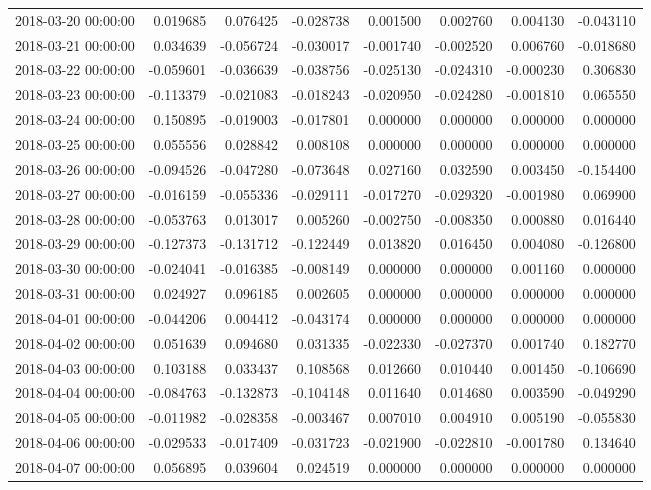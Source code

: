 \begin{tabular}{lrrrrrrr}
2018-03-20 00:00:00 & 0.019685 & 0.076425 & -0.028738 & 0.001500 & 0.002760 & 0.004130 & -0.043110 \\
2018-03-21 00:00:00 & 0.034639 & -0.056724 & -0.030017 & -0.001740 & -0.002520 & 0.006760 & -0.018680 \\
2018-03-22 00:00:00 & -0.059601 & -0.036639 & -0.038756 & -0.025130 & -0.024310 & -0.000230 & 0.306830 \\
2018-03-23 00:00:00 & -0.113379 & -0.021083 & -0.018243 & -0.020950 & -0.024280 & -0.001810 & 0.065550 \\
2018-03-24 00:00:00 & 0.150895 & -0.019003 & -0.017801 & 0.000000 & 0.000000 & 0.000000 & 0.000000 \\
2018-03-25 00:00:00 & 0.055556 & 0.028842 & 0.008108 & 0.000000 & 0.000000 & 0.000000 & 0.000000 \\
2018-03-26 00:00:00 & -0.094526 & -0.047280 & -0.073648 & 0.027160 & 0.032590 & 0.003450 & -0.154400 \\
2018-03-27 00:00:00 & -0.016159 & -0.055336 & -0.029111 & -0.017270 & -0.029320 & -0.001980 & 0.069900 \\
2018-03-28 00:00:00 & -0.053763 & 0.013017 & 0.005260 & -0.002750 & -0.008350 & 0.000880 & 0.016440 \\
2018-03-29 00:00:00 & -0.127373 & -0.131712 & -0.122449 & 0.013820 & 0.016450 & 0.004080 & -0.126800 \\
2018-03-30 00:00:00 & -0.024041 & -0.016385 & -0.008149 & 0.000000 & 0.000000 & 0.001160 & 0.000000 \\
2018-03-31 00:00:00 & 0.024927 & 0.096185 & 0.002605 & 0.000000 & 0.000000 & 0.000000 & 0.000000 \\
2018-04-01 00:00:00 & -0.044206 & 0.004412 & -0.043174 & 0.000000 & 0.000000 & 0.000000 & 0.000000 \\
2018-04-02 00:00:00 & 0.051639 & 0.094680 & 0.031335 & -0.022330 & -0.027370 & 0.001740 & 0.182770 \\
2018-04-03 00:00:00 & 0.103188 & 0.033437 & 0.108568 & 0.012660 & 0.010440 & 0.001450 & -0.106690 \\
2018-04-04 00:00:00 & -0.084763 & -0.132873 & -0.104148 & 0.011640 & 0.014680 & 0.003590 & -0.049290 \\
2018-04-05 00:00:00 & -0.011982 & -0.028358 & -0.003467 & 0.007010 & 0.004910 & 0.005190 & -0.055830 \\
2018-04-06 00:00:00 & -0.029533 & -0.017409 & -0.031723 & -0.021900 & -0.022810 & -0.001780 & 0.134640 \\
2018-04-07 00:00:00 & 0.056895 & 0.039604 & 0.024519 & 0.000000 & 0.000000 & 0.000000 & 0.000000 \\

\end{tabular}
